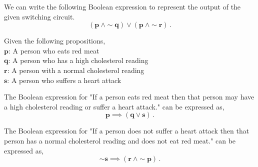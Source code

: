 \begin{subquestions}
\subquestion

We can write the following Boolean expression to represent the output of the given switching circuit.
\begin{equation}
	\boldsymbol{(p ~\land \sim q) \lor (p ~\land \sim r)}\,.
\end{equation}


\subquestion
Given the following propositions, \\
$\boldsymbol{p}$: A person who eats red meat \\
$\boldsymbol{q}$: A person who has a high cholesterol reading \\
$\boldsymbol{r}$: A person with a normal cholesterol reading \\
$\boldsymbol{s}$: A person who suffers a heart attack \\

\begin{subsubquestions}
	
\subsubquestion

The Boolean expression for "If a person eats red meat then that person may have a high cholesterol reading or suffer a heart attack." can be expressed as,
\begin{equation}
	\boldsymbol{p \implies (q \lor s)}\,.
\end{equation}


\subsubquestion

The Boolean expression for "If a person does not suffer a heart attack then that person has a normal cholesterol reading and does not eat red meat." can be expressed as,
\begin{equation}
	\boldsymbol{\sim s \implies (r ~\land \sim p)}\,.
\end{equation}


\subsubquestion


\end{subsubquestions}
\end{subquestions}
